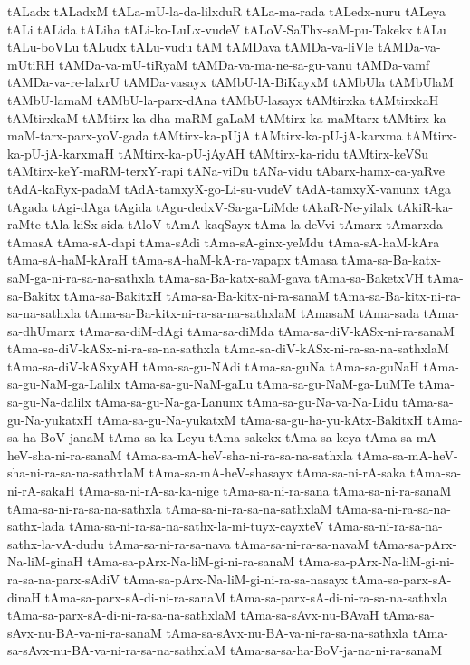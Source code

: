 {tALadx
tALadxM
tALa-mU-la-da-lilxduR
tALa-ma-rada
tALedx-nuru
tALeya
tALi
tALida
tALiha
tALi-ko-LuLx-vudeV
tALoV-SaThx-saM-pu-Takekx
tALu
tALu-boVLu
tALudx
tALu-vudu
tAM
tAMDava
tAMDa-va-liVle
tAMDa-va-mUtiRH
tAMDa-va-mU-tiRyaM
tAMDa-va-ma-ne-sa-gu-vanu
tAMDa-vamf
tAMDa-va-re-lalxrU
tAMDa-vasayx
tAMbU-lA-BiKayxM
tAMbUla
tAMbUlaM
tAMbU-lamaM
tAMbU-la-parx-dAna
tAMbU-lasayx
tAMtirxka
tAMtirxkaH
tAMtirxkaM
tAMtirx-ka-dha-maRM-gaLaM
tAMtirx-ka-maMtarx
tAMtirx-ka-maM-tarx-parx-yoV-gada
tAMtirx-ka-pUjA
tAMtirx-ka-pU-jA-karxma
tAMtirx-ka-pU-jA-karxmaH
tAMtirx-ka-pU-jAyAH
tAMtirx-ka-ridu
tAMtirx-keVSu
tAMtirx-keY-maRM-terxY-rapi
tANa-viDu
tANa-vidu
tAbarx-hamx-ca-yaRve
tAdA-kaRyx-padaM
tAdA-tamxyX-go-Li-su-vudeV
tAdA-tamxyX-vanunx
tAga
tAgada
tAgi-dAga
tAgida
tAgu-dedxV-Sa-ga-LiMde
tAkaR-Ne-yilalx
tAkiR-ka-raMte
tAla-kiSx-sida
tAloV
tAmA-kaqSayx
tAma-la-deVvi
tAmarx
tAmarxda
tAmasA
tAma-sA-dapi
tAma-sAdi
tAma-sA-ginx-yeMdu
tAma-sA-haM-kAra
tAma-sA-haM-kAraH
tAma-sA-haM-kA-ra-vapapx
tAmasa
tAma-sa-Ba-katx-saM-ga-ni-ra-sa-na-sathxla
tAma-sa-Ba-katx-saM-gava
tAma-sa-BaketxVH
tAma-sa-Bakitx
tAma-sa-BakitxH
tAma-sa-Ba-kitx-ni-ra-sanaM
tAma-sa-Ba-kitx-ni-ra-sa-na-sathxla
tAma-sa-Ba-kitx-ni-ra-sa-na-sathxlaM
tAmasaM
tAma-sada
tAma-sa-dhUmarx
tAma-sa-diM-dAgi
tAma-sa-diMda
tAma-sa-diV-kASx-ni-ra-sanaM
tAma-sa-diV-kASx-ni-ra-sa-na-sathxla
tAma-sa-diV-kASx-ni-ra-sa-na-sathxlaM
tAma-sa-diV-kASxyAH
tAma-sa-gu-NAdi
tAma-sa-guNa
tAma-sa-guNaH
tAma-sa-gu-NaM-ga-Lalilx
tAma-sa-gu-NaM-gaLu
tAma-sa-gu-NaM-ga-LuMTe
tAma-sa-gu-Na-dalilx
tAma-sa-gu-Na-ga-Lanunx
tAma-sa-gu-Na-va-Na-Lidu
tAma-sa-gu-Na-yukatxH
tAma-sa-gu-Na-yukatxM
tAma-sa-gu-ha-yu-kAtx-BakitxH
tAma-sa-ha-BoV-janaM
tAma-sa-ka-Leyu
tAma-sakekx
tAma-sa-keya
tAma-sa-mA-heV-sha-ni-ra-sanaM
tAma-sa-mA-heV-sha-ni-ra-sa-na-sathxla
tAma-sa-mA-heV-sha-ni-ra-sa-na-sathxlaM
tAma-sa-mA-heV-shasayx
tAma-sa-ni-rA-saka
tAma-sa-ni-rA-sakaH
tAma-sa-ni-rA-sa-ka-nige
tAma-sa-ni-ra-sana
tAma-sa-ni-ra-sanaM
tAma-sa-ni-ra-sa-na-sathxla
tAma-sa-ni-ra-sa-na-sathxlaM
tAma-sa-ni-ra-sa-na-sathx-lada
tAma-sa-ni-ra-sa-na-sathx-la-mi-tuyx-cayxteV
tAma-sa-ni-ra-sa-na-sathx-la-vA-dudu
tAma-sa-ni-ra-sa-nava
tAma-sa-ni-ra-sa-navaM
tAma-sa-pArx-Na-liM-ginaH
tAma-sa-pArx-Na-liM-gi-ni-ra-sanaM
tAma-sa-pArx-Na-liM-gi-ni-ra-sa-na-parx-sAdiV
tAma-sa-pArx-Na-liM-gi-ni-ra-sa-nasayx
tAma-sa-parx-sA-dinaH
tAma-sa-parx-sA-di-ni-ra-sanaM
tAma-sa-parx-sA-di-ni-ra-sa-na-sathxla
tAma-sa-parx-sA-di-ni-ra-sa-na-sathxlaM
tAma-sa-sAvx-nu-BAvaH
tAma-sa-sAvx-nu-BA-va-ni-ra-sanaM
tAma-sa-sAvx-nu-BA-va-ni-ra-sa-na-sathxla
tAma-sa-sAvx-nu-BA-va-ni-ra-sa-na-sathxlaM
tAma-sa-sa-ha-BoV-ja-na-ni-ra-sanaM
}
